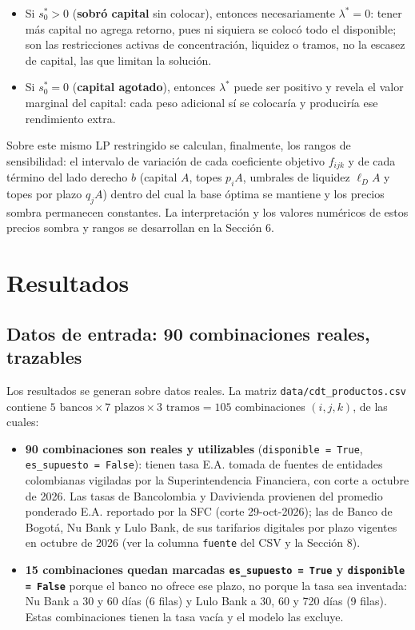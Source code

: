 \documentclass[11pt,a4paper]{article}
\begin{document}
\begin{itemize}
  \item Si $s_0^* > 0$ (\textbf{sobró capital} sin colocar), entonces necesariamente $\lambda^* = 0$: tener más capital no agrega retorno, pues ni siquiera se colocó todo el disponible; son las restricciones activas de concentración, liquidez o tramos, no la escasez de capital, las que limitan la solución.
  \item Si $s_0^* = 0$ (\textbf{capital agotado}), entonces $\lambda^*$ puede ser positivo y revela el valor marginal del capital: cada peso adicional sí se colocaría y produciría ese rendimiento extra.
\end{itemize}

Sobre este mismo LP restringido se calculan, finalmente, los rangos de sensibilidad: el intervalo de variación de cada coeficiente objetivo $f_{ijk}$ y de cada término del lado derecho $b$ (capital $A$, topes $p_i A$, umbrales de liquidez $\ell_D A$ y topes por plazo $q_j A$) dentro del cual la base óptima se mantiene y los precios sombra permanecen constantes. La interpretación y los valores numéricos de estos precios sombra y rangos se desarrollan en la Sección 6.

\section{Resultados}

\subsection{Datos de entrada: 90 combinaciones reales, trazables}

Los resultados se generan sobre datos reales. La matriz \texttt{data/cdt\_productos.csv} contiene $5
\text{ bancos} \times 7 \text{ plazos} \times 3 \text{ tramos} = 105$
combinaciones $(i, j, k)$, de las cuales:

\begin{itemize}
  \item \textbf{90 combinaciones son reales y utilizables} (\texttt{disponible = True},
  \texttt{es\_supuesto = False}): tienen tasa E.A. tomada de fuentes de entidades
  colombianas vigiladas por la Superintendencia Financiera, con corte a
  octubre de 2026. Las tasas de Bancolombia y Davivienda provienen del promedio
  ponderado E.A. reportado por la SFC (corte 29-oct-2026); las de Banco de
  Bogotá, Nu Bank y Lulo Bank, de sus tarifarios digitales por plazo vigentes en
  octubre de 2026 (ver la columna \texttt{fuente} del CSV y la Sección 8).
  \item \textbf{15 combinaciones quedan marcadas \texttt{es\_supuesto = True} y \texttt{disponible =
  False}} porque el banco no ofrece ese plazo, no porque la tasa sea
  inventada: Nu Bank a 30 y 60 días (6 filas) y Lulo Bank a 30, 60 y 720 días
  (9 filas). Estas combinaciones tienen la tasa vacía y el modelo las excluye.
\end{itemize}
\end{document}
